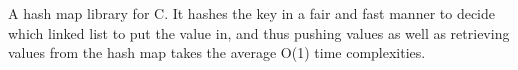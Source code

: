 A hash map library for C. It hashes the key in a fair and fast manner to decide which linked list to put the value in, and thus pushing values as well as retrieving values from the hash map takes the average O(1) time complexities. 
